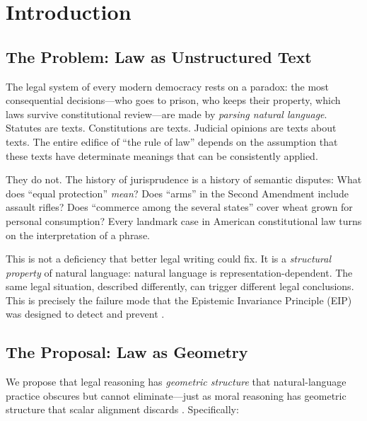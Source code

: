 \documentclass[12pt]{article}
\theoremstyle{definition}
\theoremstyle{remark}
\begin{document}
\newpage
\tableofcontents
\newpage


\section{Introduction}
\label{sec:intro}

\subsection{The Problem: Law as Unstructured Text}

The legal system of every modern democracy rests on a paradox: the most consequential decisions---who goes to prison, who keeps their property, which laws survive constitutional review---are made by \emph{parsing natural language}.  Statutes are texts.  Constitutions are texts.  Judicial opinions are texts about texts.  The entire edifice of ``the rule of law'' depends on the assumption that these texts have determinate meanings that can be consistently applied.

They do not.  The history of jurisprudence is a history of semantic disputes: What does ``equal protection'' \emph{mean}?  Does ``arms'' in the Second Amendment include assault rifles?  Does ``commerce among the several states'' cover wheat grown for personal consumption?  Every landmark case in American constitutional law turns on the interpretation of a phrase.

This is not a deficiency that better legal writing could fix.  It is a \emph{structural property} of natural language: natural language is representation-dependent.  The same legal situation, described differently, can trigger different legal conclusions.  This is precisely the failure mode that the Epistemic Invariance Principle (EIP) was designed to detect and prevent \cite{anon2025c}.

\subsection{The Proposal: Law as Geometry}

We propose that legal reasoning has \emph{geometric structure} that natural-language practice obscures but cannot eliminate---just as moral reasoning has geometric structure that scalar alignment discards \cite{anon2026a}.  Specifically:
\end{document}
